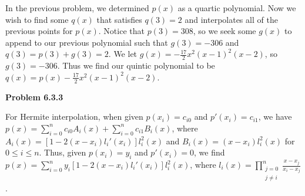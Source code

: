 \documentclass{article}
\newcommand{\Problem}[1]{\textbf{Problem #1}}
\begin{document}
In the previous problem, we determined $p(x)$ as a quartic polynomial. Now we wish to find some $q(x)$ that satisfies $q(3) = 2$ and interpolates all of the previous points for $p(x)$. Notice that $p(3) = 308$, so we seek some $g(x)$ to append to our previous polynomial such that $g(3) = -306$ and $q(3) = p(3) + g(3) = 2$. We let $g(x) = -\frac{17}{2}x^2(x-1)^2(x-2)$, so $g(3) = -306$. Thus we find our quintic polynomial to be $q(x) = p(x) -\frac{17}{2}x^2(x-1)^2(x-2)$. 

\Problem{6.3.3}

For Hermite interpolation, when given $p(x_i) = c_{i0}$ and $p'(x_i) = c_{i1}$, we have $p(x) = \displaystyle\sum_{i = 0}^n c_{i0}A_i(x) + \displaystyle\sum_{i=0}^n c_{i1}B_i(x)$, where $A_i(x) = [1 - 2(x-x_i)l_i'(x_i)]l_i^2(x)$ and $B_i(x) = (x-x_i)l_i^2(x)$ for $0 \leq i \leq n$. Thus, given $p(x_i) = y_i$ and $p'(x_i) = 0$, we find $p(x) = \displaystyle\sum_{i = 0}^n y_i[1 - 2(x-x_i)l_i'(x_i)]l_i^2(x)$, where $l_i(x) = \displaystyle\prod_{\substack{j = 0 \\ j \neq i}}^n \displaystyle\frac{x-x_j}{x_i - x_j}$.

\end{document}
